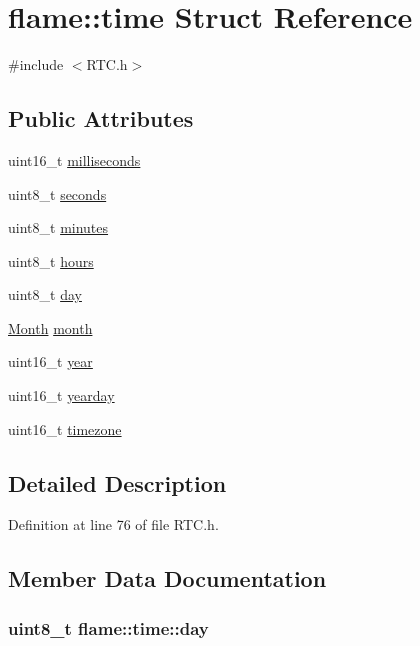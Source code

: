 \hypertarget{structflame_1_1time}{\section{flame\-:\-:time Struct Reference}
\label{structflame_1_1time}
}


{\ttfamily \#include $<$R\-T\-C.\-h$>$}

\subsection*{Public Attributes}
\begin{DoxyCompactItemize}
\item 
uint16\-\_\-t \hyperlink{structflame_1_1time_a899f1caf24d147cdd0cdeb787e289497}{milliseconds}
\item 
uint8\-\_\-t \hyperlink{structflame_1_1time_af9b2c35926951e50470223c2d05a1ca4}{seconds}
\item 
uint8\-\_\-t \hyperlink{structflame_1_1time_afda149b0149ecab591b605e108eb80ae}{minutes}
\item 
uint8\-\_\-t \hyperlink{structflame_1_1time_a1319436ec4fe46d74a865ee7717b998d}{hours}
\item 
uint8\-\_\-t \hyperlink{structflame_1_1time_a4e5ce39f9a9bc7f7e508bf7e9108091e}{day}
\item 
\hyperlink{namespaceflame_aa452b7c1018de4dfa5d302b613109649}{Month} \hyperlink{structflame_1_1time_a78a0e559562f4e7102e083da6384a1c6}{month}
\item 
uint16\-\_\-t \hyperlink{structflame_1_1time_a74325344f17f185431c09e97a7208657}{year}
\item 
uint16\-\_\-t \hyperlink{structflame_1_1time_a17f380f3785ac47964ecb96657901155}{yearday}
\item 
uint16\-\_\-t \hyperlink{structflame_1_1time_a4deaf87f9d7d63270bc9c7275fc3c4cb}{timezone}
\end{DoxyCompactItemize}


\subsection{Detailed Description}


Definition at line 76 of file R\-T\-C.\-h.



\subsection{Member Data Documentation}
\hypertarget{structflame_1_1time_a4e5ce39f9a9bc7f7e508bf7e9108091e}{
\subsubsection[{day}]{\setlength{\rightskip}{0pt plus 5cm}uint8\-\_\-t flame\-::time\-::day}}\label{structflame_1_1time_a4e5ce39f9a9bc7f7e508bf7e9108091e}


